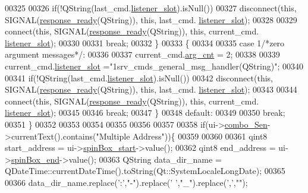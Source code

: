 \begin{DoxyCode}
00325 
00326             \textcolor{keywordflow}{if}(!QString(last\_cmd.\hyperlink{a00001_abb76d8edb39876deb60975c8fd784b3f}{listener\_slot}).isNull())
00327             disconnect(\textcolor{keyword}{this}, SIGNAL(\hyperlink{a00006_a3f6396874778799cf07a7a0149e54977}{response\_ready}(QString)), \textcolor{keyword}{this}, last\_cmd.
      \hyperlink{a00001_abb76d8edb39876deb60975c8fd784b3f}{listener\_slot});
00328 
00329             connect(\textcolor{keyword}{this}, SIGNAL(\hyperlink{a00006_a3f6396874778799cf07a7a0149e54977}{response\_ready}(QString)), \textcolor{keyword}{this}, current\_cmd.
      \hyperlink{a00001_abb76d8edb39876deb60975c8fd784b3f}{listener\_slot});
00330 
00331     \textcolor{keywordflow}{break};
00332  \}
00333  \{
00334 
00335     \textcolor{keywordflow}{case} 1\textcolor{comment}{/*zero argument messages*/}:
00336 
00337             current\_cmd.\hyperlink{a00001_affcea772a1bc5362ebbc274b6166f81b}{arg\_cnt}  = 2;
00338 
00339             current\_cmd.\hyperlink{a00001_abb76d8edb39876deb60975c8fd784b3f}{listener\_slot} =\textcolor{stringliteral}{"1srv\_cmds\_general\_msg\_handler(QString)"};
00340 
00341             \textcolor{keywordflow}{if}(!QString(last\_cmd.\hyperlink{a00001_abb76d8edb39876deb60975c8fd784b3f}{listener\_slot}).isNull())
00342             disconnect(\textcolor{keyword}{this}, SIGNAL(\hyperlink{a00006_a3f6396874778799cf07a7a0149e54977}{response\_ready}(QString)), \textcolor{keyword}{this}, last\_cmd.
      \hyperlink{a00001_abb76d8edb39876deb60975c8fd784b3f}{listener\_slot});
00343 
00344             connect(\textcolor{keyword}{this}, SIGNAL(\hyperlink{a00006_a3f6396874778799cf07a7a0149e54977}{response\_ready}(QString)), \textcolor{keyword}{this}, current\_cmd.
      \hyperlink{a00001_abb76d8edb39876deb60975c8fd784b3f}{listener\_slot});
00345 
00346     \textcolor{keywordflow}{break};
00347 \}
00348     \textcolor{keywordflow}{default}:
00349 
00350         \textcolor{keywordflow}{break};
00351     \}
00352 
00353 
00354 
00355 
00356 
00357 
00358     \textcolor{keywordflow}{if}(ui->\hyperlink{a00027_ad95005b5fcac8126171019298147b285}{combo\_Sen}->currentText().contains(\textcolor{stringliteral}{"Multiple Address"}))\{
00359 
00360 
00361           qint8 start\_address = ui->\hyperlink{a00027_acb4d6609c580645dac5aee1f1ad59d01}{spinBox\_start}->value();
00362           qint8 end\_address   = ui->\hyperlink{a00027_a8ebeb5caa10878d7806d1f548913b449}{spinBox\_end}->value();
00363           QString data\_dir\_name = QDateTime::currentDateTime().toString(Qt::SystemLocaleLongDate);
00365 
00366           data\_dir\_name.replace(\textcolor{charliteral}{':'},\textcolor{stringliteral}{"-"}).replace(\textcolor{charliteral}{' '},\textcolor{stringliteral}{"\_"}).replace(\textcolor{charliteral}{','},\textcolor{stringliteral}{""});

\end{DoxyCode}
